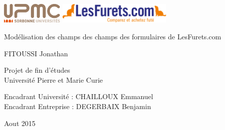 \thispagestyle{empty}
{
\sffamily
\centering
\Large

~\vspace{\fill}
\begin{center}
\includegraphics[height=1cm]{upmc.png}
\hspace{2cm}
\includegraphics[height=1cm]{lesfurets.png}
\end{center}
{\huge 
Modélisation des champs des champs des formulaires de LesFurets.com
}

\vspace{2.5cm}

{\LARGE
FITOUSSI Jonathan
}

\vspace{3.5cm}

Projet de fin d'études\\[1em]
Université Pierre et Marie Curie

\vspace{3.5cm}

Encadrant Université : CHAILLOUX Emmanuel\\
Encadrant Entreprise : DEGERBAIX Benjamin

\vspace{\fill}
\begin{center}
Aout 2015
\end{center}
}

